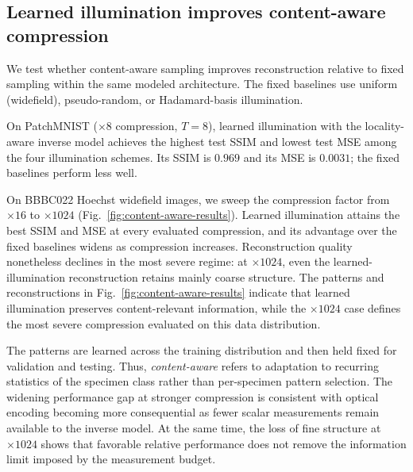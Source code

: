 \documentclass{optica-article}
\begin{document}
\subsection{Learned illumination improves content-aware compression}
\label{sec:content-aware-sampling}

We test whether content-aware sampling improves reconstruction relative to fixed sampling within the same modeled architecture. The fixed baselines use uniform (widefield), pseudo-random, or Hadamard-basis illumination.

On PatchMNIST ($\times 8$ compression, $T=8$), learned illumination with the locality-aware inverse model achieves the highest test SSIM and lowest test MSE among the four illumination schemes. Its SSIM is $0.969$ and its MSE is $0.0031$; the fixed baselines perform less well.

On BBBC022 Hoechst widefield images, we sweep the compression factor from $\times 16$ to $\times 1024$ (Fig.~\ref{fig:content-aware-results}). Learned illumination attains the best SSIM and MSE at every evaluated compression, and its advantage over the fixed baselines widens as compression increases. Reconstruction quality nonetheless declines in the most severe regime: at $\times 1024$, even the learned-illumination reconstruction retains mainly coarse structure. The patterns and reconstructions in Fig.~\ref{fig:content-aware-results} indicate that learned illumination preserves content-relevant information, while the $\times 1024$ case defines the most severe compression evaluated on this data distribution.

The patterns are learned across the training distribution and then held fixed for validation and testing. Thus, \textit{content-aware} refers to adaptation to recurring statistics of the specimen class rather than per-specimen pattern selection. The widening performance gap at stronger compression is consistent with optical encoding becoming more consequential as fewer scalar measurements remain available to the inverse model. At the same time, the loss of fine structure at $\times1024$ shows that favorable relative performance does not remove the information limit imposed by the measurement budget.
\end{document}
